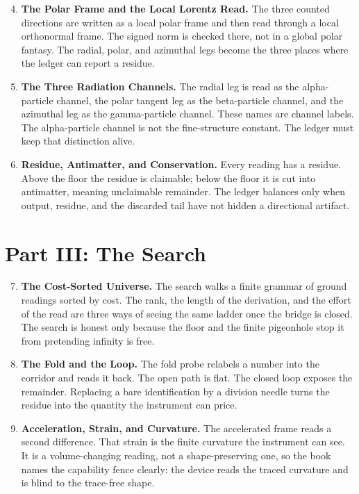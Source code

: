 \begin{enumerate}
\setcounter{enumi}{3}
\item \textbf{The Polar Frame and the Local Lorentz Read.}
The three counted directions are written as a local polar frame and then read
through a local orthonormal frame. The signed norm is checked there, not in a
global polar fantasy. The radial, polar, and azimuthal legs become the three
places where the ledger can report a residue.

\item \textbf{The Three Radiation Channels.}
The radial leg is read as the alpha-particle channel, the polar tangent leg as
the beta-particle channel, and the azimuthal leg as the gamma-particle channel.
These names are channel labels. The alpha-particle channel is not the
fine-structure constant. The ledger must keep that distinction alive.

\item \textbf{Residue, Antimatter, and Conservation.}
Every reading has a residue. Above the floor the residue is claimable; below
the floor it is cut into antimatter, meaning unclaimable remainder. The ledger
balances only when output, residue, and the discarded tail have not hidden a
directional artifact.
\end{enumerate}

\section*{Part III: The Search}

\begin{enumerate}
\setcounter{enumi}{6}
\item \textbf{The Cost-Sorted Universe.}
The search walks a finite grammar of ground readings sorted by cost. The
rank, the length of the derivation, and the effort of the read are three ways
of seeing the same ladder once the bridge is closed. The search is honest only
because the floor and the finite pigeonhole stop it from pretending infinity is
free.

\item \textbf{The Fold and the Loop.}
The fold probe relabels a number into the corridor and reads it back. The open
path is flat. The closed loop exposes the remainder. Replacing a bare
identification by a division needle turns the residue into the quantity the
instrument can price.

\item \textbf{Acceleration, Strain, and Curvature.}
The accelerated frame reads a second difference. That strain is the finite
curvature the instrument can see. It is a volume-changing reading, not a
shape-preserving one, so the book names the capability fence clearly: the
device reads the traced curvature and is blind to the trace-free shape.
\end{enumerate}

